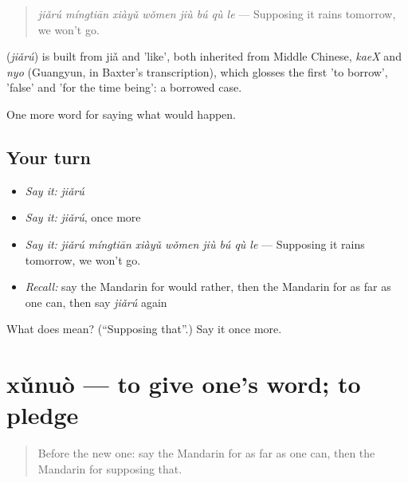 \begin{quote}
\textbf{} \emph{jiǎrú míngtiān xiàyǔ wǒmen jiù bú qù le} — Supposing it rains tomorrow, we won't go.
\end{quote}

\begin{cousinweb}
\textbf{} (\emph{jiǎrú}) is built from  jiǎ and  'like', both inherited from Middle Chinese, \emph{kaeX} and \emph{nyo} (Guangyun, in Baxter's transcription), which glosses the first 'to borrow', 'false' and 'for the time being': a borrowed case.
\end{cousinweb}

\begin{grammarlens}[title={What you've built}]
One more word for saying what would happen.
\end{grammarlens}

\subsection*{Your turn}
\begin{itemize}
\raggedright
  \item \emph{Say it:} \emph{jiǎrú}
  \item \emph{Say it:} \emph{jiǎrú}, once more
  \item \emph{Say it:} \emph{jiǎrú míngtiān xiàyǔ wǒmen jiù bú qù le} — Supposing it rains tomorrow, we won't go.
  \item \emph{Recall:} say the Mandarin for would rather, then the Mandarin for as far as one can, then say \emph{jiǎrú} again
\end{itemize}

\begin{tcolorbox}[breakable,colback=teal!4,colframe=teal!35!black,title={Before you move on}]
What does  mean? (\textquotedblleft{}Supposing that\textquotedblright{}.) Say it once more.
\end{tcolorbox}
\section[xǔnuò]{xǔnuò — to give one's word; to pledge}

\label{lesson:ZH-C534-xunuo}



\begin{quote}
Before the new one: say the Mandarin for as far as one can, then the Mandarin for supposing that.
\end{quote}

